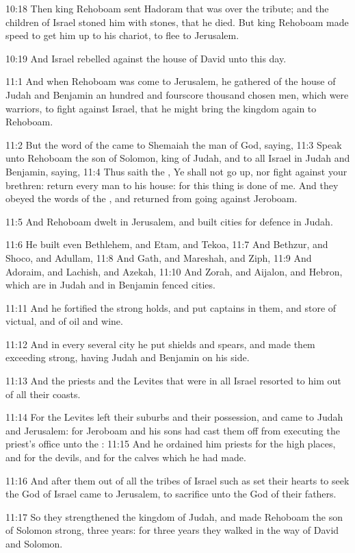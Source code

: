 10:18 Then king Rehoboam sent Hadoram that was over the tribute; and the children of Israel stoned him with stones, that he died. But king Rehoboam made speed to get him up to his chariot, to flee to Jerusalem.

10:19 And Israel rebelled against the house of David unto this day.

11:1 And when Rehoboam was come to Jerusalem, he gathered of the house of Judah and Benjamin an hundred and fourscore thousand chosen men, which were warriors, to fight against Israel, that he might bring the kingdom again to Rehoboam.

11:2 But the word of the \LORD came to Shemaiah the man of God, saying, 11:3 Speak unto Rehoboam the son of Solomon, king of Judah, and to all Israel in Judah and Benjamin, saying, 11:4 Thus saith the \LORD, Ye shall not go up, nor fight against your brethren: return every man to his house: for this thing is done of me. And they obeyed the words of the \LORD, and returned from going against Jeroboam.

11:5 And Rehoboam dwelt in Jerusalem, and built cities for defence in Judah.

11:6 He built even Bethlehem, and Etam, and Tekoa, 11:7 And Bethzur, and Shoco, and Adullam, 11:8 And Gath, and Mareshah, and Ziph, 11:9 And Adoraim, and Lachish, and Azekah, 11:10 And Zorah, and Aijalon, and Hebron, which are in Judah and in Benjamin fenced cities.

11:11 And he fortified the strong holds, and put captains in them, and store of victual, and of oil and wine.

11:12 And in every several city he put shields and spears, and made them exceeding strong, having Judah and Benjamin on his side.

11:13 And the priests and the Levites that were in all Israel resorted to him out of all their coasts.

11:14 For the Levites left their suburbs and their possession, and came to Judah and Jerusalem: for Jeroboam and his sons had cast them off from executing the priest's office unto the \LORD: 11:15 And he ordained him priests for the high places, and for the devils, and for the calves which he had made.

11:16 And after them out of all the tribes of Israel such as set their hearts to seek the \LORD God of Israel came to Jerusalem, to sacrifice unto the \LORD God of their fathers.

11:17 So they strengthened the kingdom of Judah, and made Rehoboam the son of Solomon strong, three years: for three years they walked in the way of David and Solomon.

